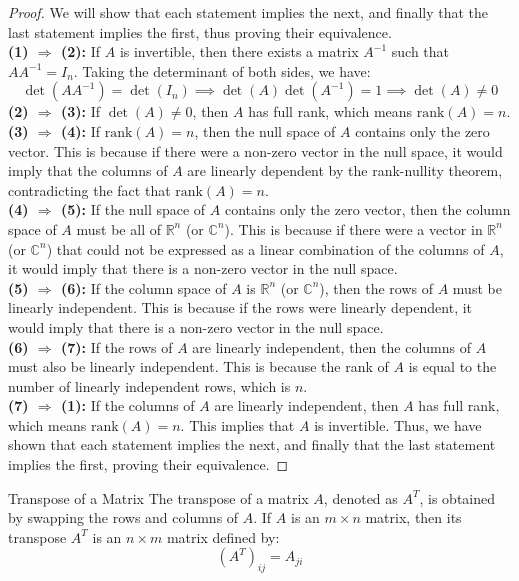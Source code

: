 \documentclass[openany]{book}
\begin{document}
\begin{proof}
    We will show that each statement implies the next, and finally that the last statement implies the first, thus proving their equivalence. \\
    \textbf{(1) $\Rightarrow$ (2):} If $A$ is invertible, then there exists a matrix $A^{-1}$ such that $AA^{-1} = I_n$. Taking the determinant of both sides, we have:
    \[
    \det(AA^{-1}) = \det(I_n) \implies \det(A)\det(A^{-1}) = 1 \implies \det(A) \neq 0
    \]
    \textbf{(2) $\Rightarrow$ (3):} If $\det(A) \neq 0$, then $A$ has full rank, which means $\text{rank}(A) = n$. \\
    \textbf{(3) $\Rightarrow$ (4):} If $\text{rank}(A) = n$, then the null space of $A$ contains only the zero vector. This is because if there were a non-zero vector in the null space, it would imply that the columns of $A$ are linearly dependent by the rank-nullity theorem, contradicting the fact that $\text{rank}(A) = n$. \\
    \textbf{(4) $\Rightarrow$ (5):} If the null space of $A$ contains only the zero vector, then the column space of $A$ must be all of $\mathbb{R}^n$ (or $\mathbb{C}^n$). This is because if there were a vector in $\mathbb{R}^n$ (or $\mathbb{C}^n$) that could not be expressed as a linear combination of the columns of $A$, it would imply that there is a non-zero vector in the null space. \\
    \textbf{(5) $\Rightarrow$ (6):} If the column space of $A$ is $\mathbb{R}^n$ (or $\mathbb{C}^n$), then the rows of $A$ must be linearly independent. This is because if the rows were linearly dependent, it would imply that there is a non-zero vector in the null space.\\
    \textbf{(6) $\Rightarrow$ (7):} If the rows of $A$ are linearly independent, then the columns of $A$ must also be linearly independent. This is because the rank of $A$ is equal to the number of linearly independent rows, which is $n$. \\
    \textbf{(7) $\Rightarrow$ (1):} If the columns of $A$ are linearly independent, then $A$ has full rank, which means $\text{rank}(A) = n$. This implies that $A$ is invertible.
    Thus, we have shown that each statement implies the next, and finally that the last statement implies the first, proving their equivalence.
\end{proof}
\begin{mydefinition}{Transpose of a Matrix}
The transpose of a matrix $A$, denoted as $A^T$, is obtained by swapping the rows and columns of $A$. If $A$ is an $m \times n$ matrix, then its transpose $A^T$ is an $n \times m$ matrix defined by:
\[(A^T)_{ij} = A_{ji}\]
\end{mydefinition}
\end{document}
